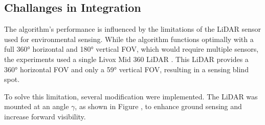         \subsection{Challanges in Integration}
            The algorithm's performance is influenced by the limitations of the \ac{LiDAR} sensor used for environmental sensing. 
            While the algorithm functions optimally with a full 360° horizontal and 180° vertical \ac{FOV}, which would require multiple sensors, the experiments used a single Livox Mid 360 \ac{LiDAR} \cite{livox_mid360}. 
            This \ac{LiDAR} provides a 360° horizontal \ac{FOV} and only a 59° vertical \ac{FOV}, resulting in a sensing blind spot.

            To solve this limitation, several modification were implemented. 
            The \ac{LiDAR} was mounted at an angle $\gamma$, as shown in Figure , to enhance ground sensing and increase forward visibility.

